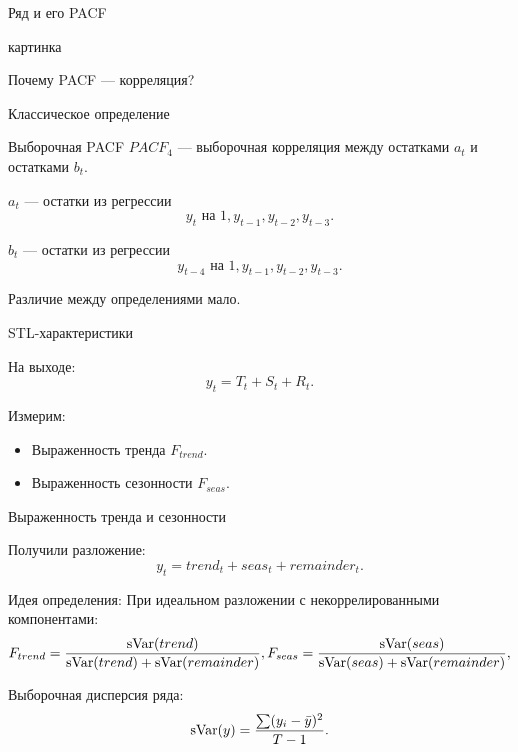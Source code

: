   \begin{frame}{Ряд и его PACF}

    картинка
    
  \end{frame}
    
  \begin{frame}{Почему PACF — корреляция?}

    \alert{Классическое определение}
  
    \begin{block}{Выборочная PACF}
      $PACF_4$ — выборочная корреляция между остатками $a_t$ и остатками $b_t$.

      $a_t$ — остатки из регрессии
      \[
        y_t \text{ на } 1, y_{t-1}, y_{t-2}, y_{t-3}.
      \]

      $b_t$ — остатки из регрессии
      \[
        y_{t-4} \text{ на } 1, y_{t-1}, y_{t-2}, y_{t-3}.
      \]
    \end{block}
  
  \pause
  Различие между определениями \alert{мало}. 
  
  \end{frame}
  

  \begin{frame}{STL-характеристики}

    \alert{На выходе:}
    \[
      y_t = T_t + S_t + R_t.
    \]

    \pause
    Измерим:
    \begin{itemize}
      \item Выраженность тренда $F_{trend}$.
      \item Выраженность сезонности $F_{seas}$.
    \end{itemize}

  \end{frame}

  \begin{frame}{Выраженность тренда и сезонности}

    Получили разложение:
    \[
      y_t = trend_t + seas_t + remainder_t.
    \]
    
    \pause
    \alert{Идея определения:}
    При идеальном разложении с некоррелированными компонентами:
    \[
      F_{trend} = \frac{\operatorname{sVar}(trend)}{\operatorname{sVar}(trend) + \operatorname{sVar}(remainder)}, F_{seas} = \frac{\operatorname{sVar}(seas)}{\operatorname{sVar}(seas) + \operatorname{sVar}(remainder)}, 
    \]

    \pause
    \alert{Выборочная дисперсия} ряда:
    \[
      \operatorname{sVar}(y) = \frac{\sum (y_i - \bar y)^2}{T - 1}.
    \]
  \end{frame}

